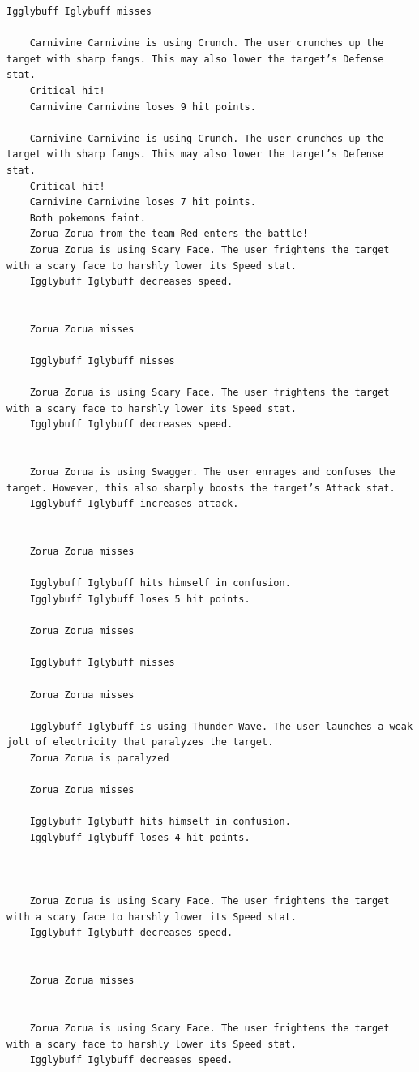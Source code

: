 \begin{lstlisting}[caption={Результат выполнения программы},label={lst:result}]
    Igglybuff Iglybuff misses

    Carnivine Carnivine is using Crunch. The user crunches up the target with sharp fangs. This may also lower the target’s Defense stat.
    Critical hit!
    Carnivine Carnivine loses 9 hit points.

    Carnivine Carnivine is using Crunch. The user crunches up the target with sharp fangs. This may also lower the target’s Defense stat.
    Critical hit!
    Carnivine Carnivine loses 7 hit points.
    Both pokemons faint.
    Zorua Zorua from the team Red enters the battle!
    Zorua Zorua is using Scary Face. The user frightens the target with a scary face to harshly lower its Speed stat.
    Igglybuff Iglybuff decreases speed.


    Zorua Zorua misses

    Igglybuff Iglybuff misses

    Zorua Zorua is using Scary Face. The user frightens the target with a scary face to harshly lower its Speed stat.
    Igglybuff Iglybuff decreases speed.


    Zorua Zorua is using Swagger. The user enrages and confuses the target. However, this also sharply boosts the target’s Attack stat.
    Igglybuff Iglybuff increases attack.


    Zorua Zorua misses

    Igglybuff Iglybuff hits himself in confusion.
    Igglybuff Iglybuff loses 5 hit points.

    Zorua Zorua misses

    Igglybuff Iglybuff misses

    Zorua Zorua misses

    Igglybuff Iglybuff is using Thunder Wave. The user launches a weak jolt of electricity that paralyzes the target.
    Zorua Zorua is paralyzed

    Zorua Zorua misses

    Igglybuff Iglybuff hits himself in confusion.
    Igglybuff Iglybuff loses 4 hit points.



    Zorua Zorua is using Scary Face. The user frightens the target with a scary face to harshly lower its Speed stat.
    Igglybuff Iglybuff decreases speed.


    Zorua Zorua misses


    Zorua Zorua is using Scary Face. The user frightens the target with a scary face to harshly lower its Speed stat.
    Igglybuff Iglybuff decreases speed.



\end{lstlisting}
